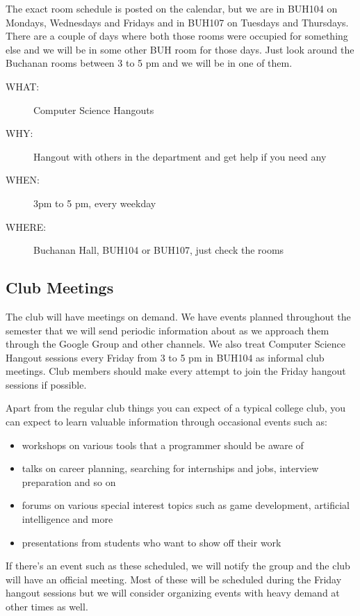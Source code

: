 The exact room schedule is posted on the calendar, but we are in BUH104 on
Mondays, Wednesdays and Fridays and in BUH107 on Tuesdays and Thursdays. There
are a couple of days where both those rooms were occupied for something else
and we will be in some other BUH room for those days. Just look around the
Buchanan rooms between 3 to 5 pm and we will be in one of them.

\begin{description}
\item[{WHAT:}] Computer Science Hangouts
\item[{WHY:}] Hangout with others in the department and get help if you need any
\item[{WHEN:}] 3pm to 5 pm, every weekday
\item[{WHERE:}] Buchanan Hall, BUH104 or BUH107, just check the rooms
\end{description}

\newpage

\subsection{Club Meetings}
\label{sec-2-5}

The club will have meetings on demand. We have events planned throughout the
semester that we will send periodic information about as we approach them
through the Google Group and other channels. We also treat Computer Science
Hangout sessions every Friday from 3 to 5 pm in BUH104 as informal club
meetings. Club members should make every attempt to join the Friday hangout
sessions if possible.

Apart from the regular club things you can expect of a typical
college club, you can expect to learn valuable information through occasional
events such as:
\begin{itemize}
\item workshops on various tools that a programmer should be aware of
\item talks on career planning, searching for internships and jobs, interview
preparation and so on
\item forums on various special interest topics such as game development,
artificial intelligence and more
\item presentations from students who want to show off their work
\end{itemize}

If there's an event such as these scheduled, we will notify the group and the
club will have an official meeting. Most of these will be scheduled during the
Friday hangout sessions but we will consider organizing events with heavy
demand at other times as well.

